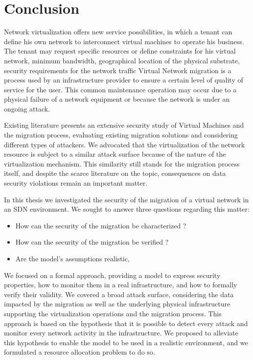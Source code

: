 \section{Conclusion}
\label{sec:thesis_conclusion}
Network virtualization offers new service possibilities, in which a tenant can define his own network to interconnect virtual machines to operate his business. The tenant may request specific resources or define constraints for his virtual network, \eg minimum bandwidth, geographical location of the physical substrate, security requirements for the network traffic \etc
Virtual Network migration is a process used by an infrastructure provider to ensure a certain level of quality of service for the user.
This common maintenance operation may occur due to a physical failure of a network equipment or because the network is under an ongoing attack.

Existing literature presents an extensive security study of Virtual Machines and the migration process, evaluating existing migration solutions and considering different types of attackers. We advocated that the virtualization of the network resource is subject to a similar attack surface because of the nature of the virtualization mechanism. This similarity still stands for the migration process itself, and despite the scarce literature on the topic, consequences on data security violations remain an important matter.

In this thesis we investigated the security of the migration of a virtual network in an SDN environment. 
We sought to answer three questions regarding this matter:

\begin{itemize}
    \item How can the security of the migration be characterized ?
    \item How can the security of the migration be verified ?
    \item Are the model's assumptions realistic, 
\end{itemize}

We focused on a formal approach, providing a model to express security properties, how to monitor them in a real infrastructure, and how to formally verify their validity. 
We covered a broad attack surface, considering the data impacted by the migration as well as the underlying physical infrastructure supporting the virtualization operations and the migration process. 
This approach is based on the hypothesis that it is possible to detect every attack and monitor every network activity in the infrastructure. 
We proposed to alleviate this hypothesis to enable the model to be used in a realistic environment, and we formulated a resource allocation problem to do so.

